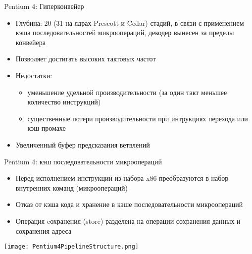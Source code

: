 \documentclass[aspectratio=169,14pt]{beamer}
\begin{document}
\begin{frame}{Pentium 4: Гиперконвейер}
    \begin{itemize}
        \item Глубина: 20 (31 на ядрах Prescott и Cedar) стадий, в связи
        с применением кэша последовательностей микроопераций, декодер
        вынесен за пределы конвейера
        \item Позволяет достигать высоких тактовых частот
        \item Недостатки:
        \begin{itemize}
            \item уменьшение удельной производительности (за один
            такт меньшее количество инструкций)
            \item существенные потери производительности при
            интрукциях перехода или кэш-промахе
        \end{itemize}
        \item Увеличенный буфер предсказания ветвлений
    \end{itemize}
\end{frame}

\begin{frame}{Pentium 4: кэш последовательности микроопераций}
    \begin{itemize}
        \item Перед исполнением инструкции из набора x86 преобразуются
        в набор внутренних команд (микроопераций)
        \item Отказ от кэша кода и хранение в кэше
        последовательности микроопераций
        \item Операция cохранения (store) разделена на операции
        сохранения данных и сохранения адреса
    \end{itemize}
    \texttt{[image: Pentium4PipelineStructure.png]}
\end{frame}
\end{document}
